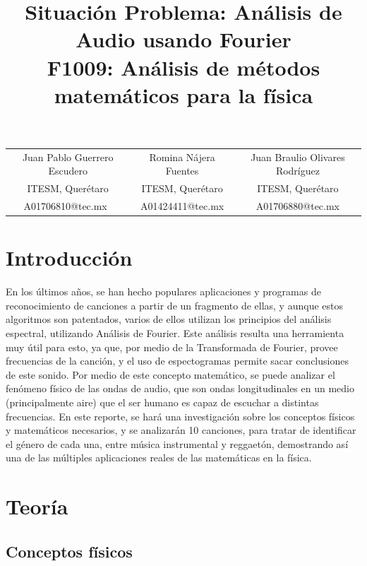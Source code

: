 \documentclass[12pt, letterpaper]{article}
\title{%
  Situación Problema: Análisis de Audio usando Fourier \\
  \large F1009: Análisis de métodos matemáticos para la física}
\author{}
\begin{document}
\maketitle

\begin{tabular}{ccc}
Juan Pablo Guerrero Escudero & Romina Nájera Fuentes & Juan Braulio Olivares Rodríguez\\
ITESM, Querétaro & ITESM, Querétaro & ITESM, Querétaro\\
A01706810@tec.mx & A01424411@tec.mx & A01706880@tec.mx
\end{tabular}


\section{Introducción}
En los últimos años, se han hecho populares aplicaciones y programas de reconocimiento de 
canciones a partir de un fragmento de ellas, y aunque estos algoritmos son patentados, varios de ellos
utilizan los principios del análisis espectral, utilizando Análisis de Fourier. Este análisis
resulta una herramienta muy útil para esto, ya que, por medio de la Transformada de Fourier, provee frecuencias de 
la canción, y el uso de espectogramas permite sacar conclusiones de este sonido. Por medio de 
este concepto matemático, se puede analizar el fenómeno físico de las ondas de audio, que son ondas longitudinales 
en un medio (principalmente aire) que el ser humano es capaz de escuchar a distintas frecuencias. En este reporte, se 
hará una investigación sobre los conceptos físicos y matemáticos necesarios, y se analizarán 10 canciones, para 
tratar de identificar el género de cada una, entre música instrumental y reggaetón, demostrando así una de las múltiples aplicaciones reales de las matemáticas en la física.
\section{Teoría}

\subsection{Conceptos físicos}
\end{document}
